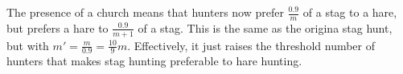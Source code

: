 \documentclass{article}
\begin{document}
The presence of a church means that hunters now prefer $\frac{0.9}{m}$ of a stag to a hare, but prefers a hare to $\frac{0.9}{m + 1}$ of a stag. This is the same as the origina stag hunt, but with $m' = \frac{m}{0.9} = \frac{10}{9}m$. Effectively, it just raises the threshold number of hunters that makes stag hunting preferable to hare hunting.
\end{document}
